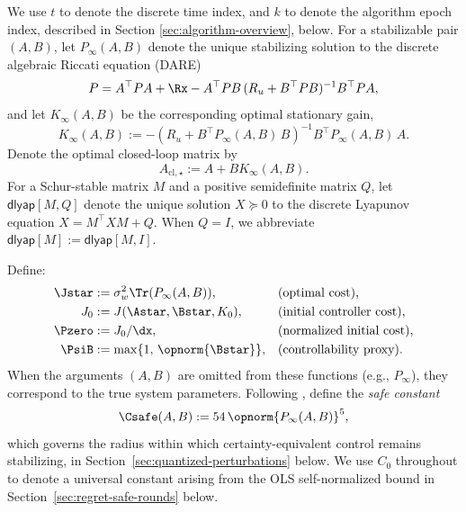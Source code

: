 \documentclass[11pt,journal,onecolumn]{IEEEtran}
\begin{document}
We use $t$ to denote the discrete time index, and $k$ to denote the algorithm epoch index, described in Section \ref{sec:algorithm-overview}, below. For a stabilizable pair $(A,B)$, let $P_\infty(A,B)$ denote the unique stabilizing solution to the discrete algebraic Riccati equation (DARE)
\begin{equation}\label{eq:dare}
    P = A^\top P A + \Rx - A^\top P B\,(R_u + B^\top P B)^{-1} B^\top P A,
\end{equation}
and let $K_\infty(A,B)$ be the corresponding optimal stationary gain,
\begin{equation}\label{eq:Kstar}
    K_\infty(A,B) := -(R_u + B^\top P_\infty(A,B)\, B)^{-1} B^\top P_\infty(A,B)\, A.
\end{equation}
Denote the optimal closed-loop matrix by
\begin{equation}\label{eq:Acl-star}
    A_{\mathrm{cl},\star} := A + B K_\infty(A,B).
\end{equation}
For a Schur-stable matrix $M$ and a positive semidefinite matrix $Q$, let $\mathsf{dlyap}[M, Q]$ denote the unique solution $X \succeq 0$ to the discrete Lyapunov equation $X = M^\top X M + Q$. When $Q = I$, we abbreviate $\mathsf{dlyap}[M] := \mathsf{dlyap}[M, I]$.

Define:
\begin{align}
    \Jstar &:= \sigma_w^2 \Tr(P_\infty(A,B)), & &\text{(optimal cost),} \label{eq:Jstar_tr} \\
    J_0 &:= J(\Astar,\Bstar,K_0), & &\text{(initial controller cost),} \label{eq:J0} \\
    \Pzero &:= J_0 / \dx, & &\text{(normalized initial cost),} \label{eq:P0} \\
    \PsiB &:= \max\{1,\, \opnorm{\Bstar}\}, & &\text{(controllability proxy).} \label{eq:PsiB}
\end{align}
When the arguments $(A,B)$ are omitted from these functions (e.g., $P_\infty$), they correspond to the true system parameters.
Following \cite{simchowitz20a}, define the \emph{safe constant}
\begin{equation}\label{eq:Csafe-def}
    \Csafe(A,B) := 54\,\opnorm{P_\infty(A,B)}^5,
\end{equation}
which governs the radius within which certainty-equivalent control remains stabilizing, in Section~\ref{sec:quantized-perturbations} below. We use $C_0$ throughout to denote a universal constant arising from the OLS self-normalized bound in Section~\ref{sec:regret-safe-rounds} below.


\end{document}

